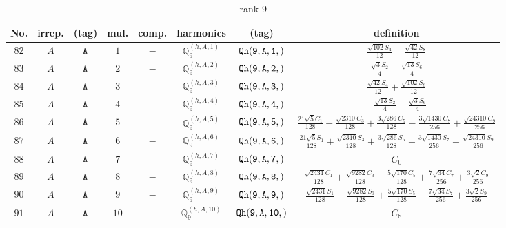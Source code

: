 \documentclass[fleqn,8pt]{jsarticle}
\begin{document}
\begin{table}[ht!]
\begin{center}
\caption{rank 9}
\renewcommand{\arraystretch}{1.3}
\begin{tabular}{cccccccc} \hline \hline
No. & irrep. & (tag) & mul. & comp. & harmonics & (tag) & definition \\ \hline
$ 82 $ & $ A $ & $ {\tt A} $ & $ 1 $ & $ - $ & $ \mathbb{Q}_{9}^{(h,A,1)} $ & $ {\tt Qh(9,A,1,)} $ & $ \frac{\sqrt{102} S_{4}}{12} - \frac{\sqrt{42} S_{8}}{12} $ \\
$ 83 $ & $ A $ & $ {\tt A} $ & $ 2 $ & $ - $ & $ \mathbb{Q}_{9}^{(h,A,2)} $ & $ {\tt Qh(9,A,2,)} $ & $ \frac{\sqrt{3} S_{2}}{4} - \frac{\sqrt{13} S_{6}}{4} $ \\
$ 84 $ & $ A $ & $ {\tt A} $ & $ 3 $ & $ - $ & $ \mathbb{Q}_{9}^{(h,A,3)} $ & $ {\tt Qh(9,A,3,)} $ & $ \frac{\sqrt{42} S_{4}}{12} + \frac{\sqrt{102} S_{8}}{12} $ \\
$ 85 $ & $ A $ & $ {\tt A} $ & $ 4 $ & $ - $ & $ \mathbb{Q}_{9}^{(h,A,4)} $ & $ {\tt Qh(9,A,4,)} $ & $ - \frac{\sqrt{13} S_{2}}{4} - \frac{\sqrt{3} S_{6}}{4} $ \\
$ 86 $ & $ A $ & $ {\tt A} $ & $ 5 $ & $ - $ & $ \mathbb{Q}_{9}^{(h,A,5)} $ & $ {\tt Qh(9,A,5,)} $ & $ \frac{21 \sqrt{5} C_{1}}{128} - \frac{\sqrt{2310} C_{3}}{128} + \frac{3 \sqrt{286} C_{5}}{128} - \frac{3 \sqrt{1430} C_{7}}{256} + \frac{\sqrt{24310} C_{9}}{256} $ \\
$ 87 $ & $ A $ & $ {\tt A} $ & $ 6 $ & $ - $ & $ \mathbb{Q}_{9}^{(h,A,6)} $ & $ {\tt Qh(9,A,6,)} $ & $ \frac{21 \sqrt{5} S_{1}}{128} + \frac{\sqrt{2310} S_{3}}{128} + \frac{3 \sqrt{286} S_{5}}{128} + \frac{3 \sqrt{1430} S_{7}}{256} + \frac{\sqrt{24310} S_{9}}{256} $ \\
$ 88 $ & $ A $ & $ {\tt A} $ & $ 7 $ & $ - $ & $ \mathbb{Q}_{9}^{(h,A,7)} $ & $ {\tt Qh(9,A,7,)} $ & $ C_{0} $ \\
$ 89 $ & $ A $ & $ {\tt A} $ & $ 8 $ & $ - $ & $ \mathbb{Q}_{9}^{(h,A,8)} $ & $ {\tt Qh(9,A,8,)} $ & $ \frac{\sqrt{2431} C_{1}}{128} + \frac{\sqrt{9282} C_{3}}{128} + \frac{5 \sqrt{170} C_{5}}{128} + \frac{7 \sqrt{34} C_{7}}{256} + \frac{3 \sqrt{2} C_{9}}{256} $ \\
$ 90 $ & $ A $ & $ {\tt A} $ & $ 9 $ & $ - $ & $ \mathbb{Q}_{9}^{(h,A,9)} $ & $ {\tt Qh(9,A,9,)} $ & $ \frac{\sqrt{2431} S_{1}}{128} - \frac{\sqrt{9282} S_{3}}{128} + \frac{5 \sqrt{170} S_{5}}{128} - \frac{7 \sqrt{34} S_{7}}{256} + \frac{3 \sqrt{2} S_{9}}{256} $ \\
$ 91 $ & $ A $ & $ {\tt A} $ & $ 10 $ & $ - $ & $ \mathbb{Q}_{9}^{(h,A,10)} $ & $ {\tt Qh(9,A,10,)} $ & $ C_{8} $ \\

\end{tabular}
\end{center}
\end{table}
\end{document}
